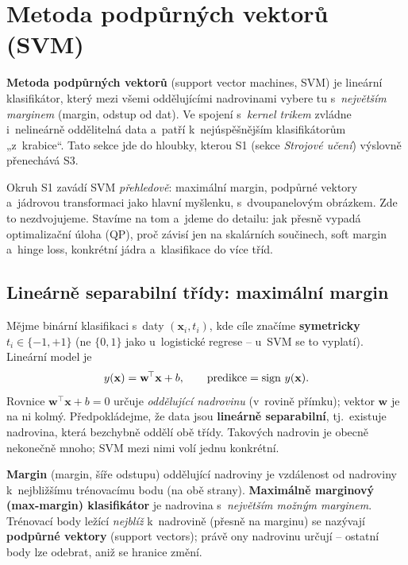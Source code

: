 \section{Metoda podpůrných vektorů (SVM)}\label{sec:svm}

\textbf{Metoda podpůrných vektorů} (support vector machines, SVM) je lineární klasifikátor, který mezi všemi oddělujícími nadrovinami vybere tu s~\emph{největším marginem} (margin, odstup od dat). Ve spojení s~\emph{kernel trikem} zvládne i~nelineárně oddělitelná data a~patří k~nejúspěšnějším klasifikátorům „z~krabice``. Tato sekce jde do hloubky, kterou S1 (sekce \emph{Strojové učení}) výslovně přenechává S3.

\begin{poznamka}[Vztah k~S1]
Okruh S1 zavádí SVM \emph{přehledově}: maximální margin, podpůrné vektory a~jádrovou transformaci jako hlavní myšlenku, s~dvoupanelovým obrázkem. Zde to nezdvojujeme. Stavíme na tom a~jdeme do detailu: jak přesně vypadá optimalizační úloha (QP), proč závisí jen na skalárních součinech, soft margin a~hinge loss, konkrétní jádra a~klasifikace do více tříd.
\end{poznamka}

\subsection{Lineárně separabilní třídy: maximální margin}

Mějme binární klasifikaci s~daty $(\mathbf{x}_i,t_i)$, kde cíle značíme \textbf{symetricky} $t_i\in\{-1,+1\}$ (ne $\{0,1\}$ jako u~logistické regrese -- u~SVM se to vyplatí). Lineární model je
\[ y(\mathbf{x}) = \mathbf{w}^{\!\top}\mathbf{x} + b, \qquad \text{predikce} = \operatorname{sign}\,y(\mathbf{x}). \]
Rovnice $\mathbf{w}^{\!\top}\mathbf{x}+b=0$ určuje \emph{oddělující nadrovinu} (v~rovině přímku); vektor $\mathbf{w}$ je na ni kolmý. Předpokládejme, že data jsou \textbf{lineárně separabilní}, tj.\ existuje nadrovina, která bezchybně oddělí obě třídy. Takových nadrovin je obecně nekonečně mnoho; SVM mezi nimi volí jednu konkrétní.

\begin{definice}
\textbf{Margin} (margin, šíře odstupu) oddělující nadroviny je vzdálenost od nadroviny k~nejbližšímu trénovacímu bodu (na obě strany). \textbf{Maximálně marginový (max-margin) klasifikátor} je nadrovina s~\emph{největším možným marginem}. Trénovací body ležící \emph{nejblíž} k~nadrovině (přesně na marginu) se nazývají \textbf{podpůrné vektory} (support vectors); právě ony nadrovinu určují -- ostatní body lze odebrat, aniž se hranice změní.
\end{definice}

